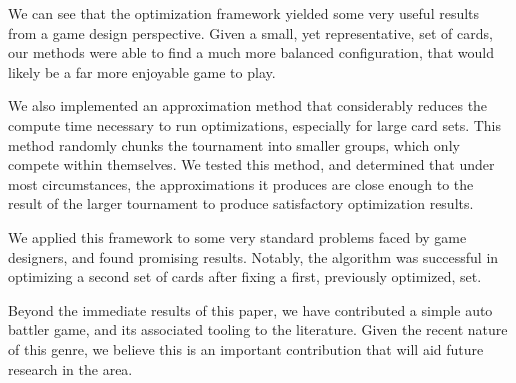 We can see that the optimization framework yielded some very useful results from a game design perspective. Given a small, yet representative, set of cards, our methods were able to find a much more balanced configuration, that would likely be a far more enjoyable game to play.

We also implemented an approximation method that considerably reduces the compute time necessary to run optimizations, especially for large card sets. This method randomly chunks the tournament into smaller groups, which only compete within themselves. We tested this method, and determined that under most circumstances, the approximations it produces are close enough to the result of the larger tournament to produce satisfactory optimization results. 

We applied this framework to some very standard problems faced by game designers, and found promising results. Notably, the algorithm was successful in optimizing a second set of cards after fixing a first, previously optimized, set.

Beyond the immediate results of this paper, we have contributed a simple auto battler game, and its associated tooling to the literature. Given the recent nature of this genre, we believe this is an important contribution that will aid future research in the area. 